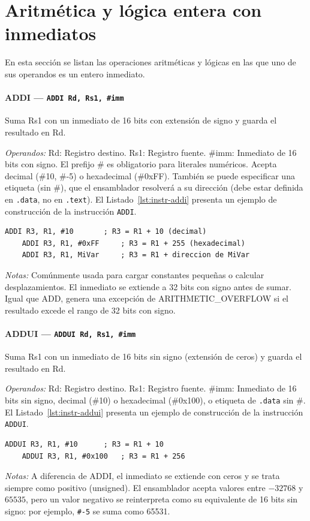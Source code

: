 \documentclass[../main.tex]{subfiles}
\begin{document}
\section{Aritmética y lógica entera con inmediatos}

En esta sección se listan las operaciones aritméticas y lógicas en las que uno de sus operandos es un entero inmediato.

\paragraph*{ADDI --- \texttt{ADDI Rd, Rs1, \#imm}}
Suma Rs1 con un inmediato de 16 bits con extensión de signo y guarda el resultado en Rd.

\textit{Operandos:} Rd: Registro destino. Rs1: Registro fuente. \#imm: Inmediato de 16 bits con signo. El prefijo \# es obligatorio para literales numéricos. Acepta decimal (\#10, \#-5) o hexadecimal (\#0xFF). También se puede especificar una etiqueta (sin \#), que el ensamblador resolverá a su dirección (debe estar definida en \texttt{.data}, no en \texttt{.text}).
El Listado~\ref{lst:instr-addi} presenta un ejemplo de construcción de la instrucción \texttt{ADDI}.

\begin{lstlisting}[caption={ADDI},label={lst:instr-addi}]
	ADDI R3, R1, #10       ; R3 = R1 + 10 (decimal)
	ADDI R3, R1, #0xFF     ; R3 = R1 + 255 (hexadecimal)
	ADDI R3, R1, MiVar     ; R3 = R1 + direccion de MiVar
\end{lstlisting}
\textit{Notas:} Comúnmente usada para cargar constantes pequeñas o calcular desplazamientos. El inmediato se extiende a 32 bits con signo antes de sumar. Igual que ADD, genera una excepción de ARITHMETIC\_OVERFLOW si el resultado excede el rango de 32 bits con signo.

\paragraph*{ADDUI --- \texttt{ADDUI Rd, Rs1, \#imm}}
Suma Rs1 con un inmediato de 16 bits sin signo (extensión de ceros) y guarda el resultado en Rd.

\textit{Operandos:} Rd: Registro destino. Rs1: Registro fuente. \#imm: Inmediato de 16 bits sin signo, decimal (\#10) o hexadecimal (\#0x100), o etiqueta de \texttt{.data} sin \#.
El Listado~\ref{lst:instr-addui} presenta un ejemplo de construcción de la instrucción \texttt{ADDUI}.

\begin{lstlisting}[caption={ADDUI},label={lst:instr-addui}]
	ADDUI R3, R1, #10      ; R3 = R1 + 10
	ADDUI R3, R1, #0x100   ; R3 = R1 + 256
\end{lstlisting}
\textit{Notas:} A diferencia de ADDI, el inmediato se extiende con ceros y se trata siempre como positivo (unsigned). El ensamblador acepta valores entre $-32768$ y $65535$, pero un valor negativo se reinterpreta como su equivalente de 16 bits sin signo: por ejemplo, \texttt{\#-5} se suma como 65531.
\end{document}
